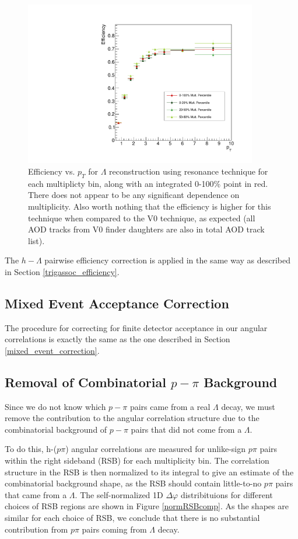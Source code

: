 \documentclass[ALICE,manyauthors]{ALICE_analysis_notes}
\begin{document}
\begin{itemize}
\begin{figure}[ht]
\centering
\includegraphics[width=4in]{figures/res_efficiency.pdf}
\caption{Efficiency vs. $p_T$ for $\Lambda$ reconstruction using resonance technique for each multiplicty bin, along with an integrated 0-100\% point in red. There does not appear to be any significant dependence on multiplicity. Also worth nothing that the efficiency is higher for this technique when compared to the V0 technique, as expected (all AOD tracks from V0 finder daughters are also in total AOD track list).}
\label{lambda_eff_res}
\end{figure}

The $h-\Lambda$ pairwise efficiency correction is applied in the same way as described in Section \ref{trigassoc_efficiency}.

\subsection{Mixed Event Acceptance Correction}
\label{mixed_event_res}
The procedure for correcting for finite detector acceptance in our angular correlations is exactly the same as the one described in Section \ref{mixed_event_correction}.


\subsection{Removal of Combinatorial $p-\pi$ Background}
\label{removecomb}

Since we do not know which $p-\pi$ pairs came from a real $\Lambda$ decay, we must remove the contribution to the angular correlation structure due to the combinatorial background of $p-\pi$ pairs that did not come from a $\Lambda$.

To do this, h-($p\pi$) angular correlations are measured for unlike-sign $p\pi$ pairs within the right sideband (RSB) for each multiplicity bin. The correlation structure in the RSB is then normalized to its integral to give an estimate of the combinatorial background shape, as the RSB should contain little-to-no $p\pi$ pairs that came from a $\Lambda$. The self-normalized 1D $\Delta\varphi$ distribituions for different choices of RSB regions are shown in Figure \ref{normRSBcomp}. As the shapes are similar for each choice of RSB, we conclude that there is no substantial contribution from $p\pi$ pairs coming from $\Lambda$ decay.


\end{itemize}
\end{document}
